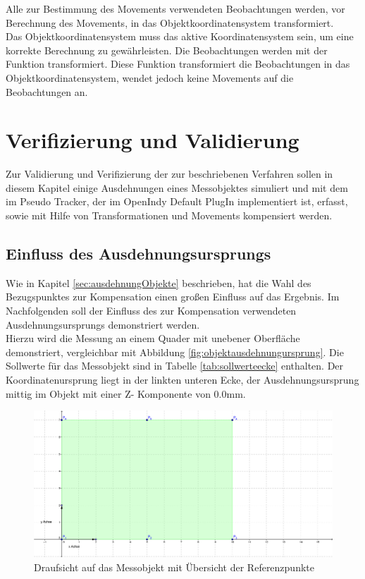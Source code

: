 Alle zur Bestimmung des Movements verwendeten Beobachtungen werden, vor Berechnung des Movements, in das Objektkoordinatensystem transformiert.\\
Das Objektkoordinatensystem muss das aktive Koordinatensystem sein, um eine korrekte Berechnung zu gewährleisten. Die Beobachtungen werden mit der Funktion  transformiert. Diese Funktion transformiert die Beobachtungen in das Objektkoordinatensystem, wendet jedoch keine Movements auf die Beobachtungen an.

\chapter{Verifizierung und Validierung}\label{chap:testmessungen}

Zur Validierung und Verifizierung der zur beschriebenen Verfahren sollen in diesem Kapitel einige Ausdehnungen eines Messobjektes simuliert und mit dem im Pseudo Tracker, der im OpenIndy Default PlugIn implementiert ist, erfasst, sowie mit Hilfe von Transformationen und Movements kompensiert werden.

\section{Einfluss des Ausdehnungsursprungs}\label{sec:einflussausdehnungsursprung}

Wie in Kapitel \ref{sec:ausdehnungObjekte} beschrieben, hat die Wahl des Bezugspunktes zur Kompensation einen großen Einfluss auf das Ergebnis. Im Nachfolgenden soll der Einfluss des zur Kompensation verwendeten Ausdehnungsursprungs demonstriert werden.\\
Hierzu wird die Messung an einem Quader mit unebener Oberfläche demonstriert, vergleichbar mit Abbildung \ref{fig:objektausdehnungursprung}. Die Sollwerte für das Messobjekt sind in Tabelle \ref{tab:sollwerteecke} enthalten. Der Koordinatenursprung liegt in der linkten unteren Ecke, der Ausdehnungsursprung mittig im Objekt mit einer Z- Komponente von 0.0mm.
\begin{figure}[H]
	\label{fig:objektursprungecke}
	\centering
		\includegraphics[scale=0.8]{bilder/objektursprungecke}
	\caption[Draufsicht auf das Messobjekt]{Draufsicht auf das Messobjekt mit Übersicht der Referenzpunkte\protect\footnotemark}
\end{figure}

